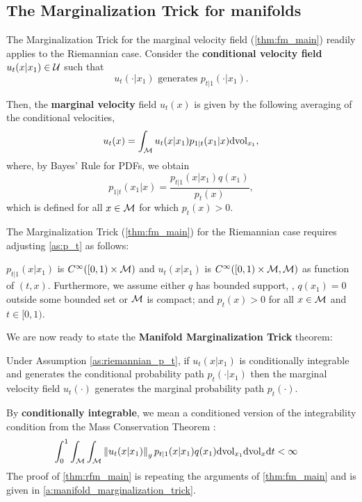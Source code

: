 \documentclass{fairmeta}
\newcommand{\highlight}[1]{{\color{metablue} \textbf{#1}}}
\renewcommand{\eqref}[1]{\labelcref{#1}}
\numberwithin{equation}{section}
\begin{document}
\subsection{The Marginalization Trick for manifolds}

The Marginalization Trick for the marginal velocity field (\cref{thm:fm_main}) readily applies to the Riemannian case.
Consider the \highlight{conditional velocity field} $u_t(x|x_1)\in{\mathcal{U}}$ such that 
\begin{equation}\label{e:riemannian_u_t|1_generates_p_t|1}
    u_{t}(\cdot|x_1) \text{ generates } p_{t|1}(\cdot|x_1).
\end{equation}

Then, the \highlight{marginal velocity} field $u_t(x)$ is given by the following averaging of the conditional velocities,
\begin{equation}\label{e:riemanniam_u_t}
    u_t(x) = \int_\gM u_t(x|x_1)p_{1|t}(x_1|x) \dd \vol_{x_1}, %
\end{equation}
where, by Bayes' Rule for PDFs, we obtain
\begin{equation} 
p_{1|t}(x_1|x) = \frac{p_{t|1}(x|x_1)q(x_1)}{p_t(x)},
\end{equation}
which is defined for all $x\in{\mathcal{M}}$ for which $p_t(x)>0$.

The Marginalization Trick (\cref{thm:fm_main}) for the Riemannian case requires adjusting \cref{as:p_t} as follows:
\begin{myframe}
\begin{assumption}\label{as:riemannian_p_t}
$p_{t|1}(x|x_1)$ is $C^\infty([0,1)\times {\mathcal{M}})$ and $u_t(x|x_1)$ is $C^\infty([0,1)\times {\mathcal{M}},{\mathcal{M}})$ as function of $(t,x)$. Furthermore, we assume either $q$ has bounded support, \ie, $q(x_1)=0$ outside some bounded set or ${\mathcal{M}}$ is compact; and $p_t(x)>0$ for all $x\in{\mathcal{M}}$ and $t\in[0,1)$.
\end{assumption}    
\end{myframe}
We are now ready to state the \highlight{Manifold  Marginalization Trick} theorem:
\begin{myframe}
    \begin{theorem}\label{thm:rfm_main} Under Assumption \ref{as:riemannian_p_t}, if $u_t(x|x_1)$ is conditionally integrable and generates the conditional probability path $p_t(\cdot|x_1)$ then the marginal velocity field $u_t(\cdot)$ generates the marginal probability path $p_t(\cdot)$.
\end{theorem}
\end{myframe}
By \highlight{conditionally integrable}, we mean a conditioned version of the integrability condition from the Mass Conservation Theorem \eqref{e:manifold_integrable}:
\begin{align}\label{e:riemannian_conditional_integrable}
    \int^1_0\int_{\mathcal{M}}\int_{\mathcal{M}} \left\Vert u_t(x|x_1)\right\Vert_g p_{t|1}(x|x_1) q(x_1) \mathrm{d} \mathrm{vol}_{x_1} \mathrm{d} \mathrm{vol}_{x} \mathrm{d} t &< \infty
\end{align}
The proof of \cref{thm:rfm_main} is repeating the arguments of \cref{thm:fm_main} and is given in \cref{a:manifold_marginalization_trick}.
\end{document}
